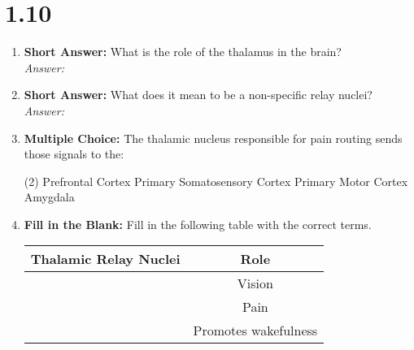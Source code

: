 \section*{1.10}
\begin{enumerate}[label=\textbf{Q1.10.\arabic*}]
      \item \textbf{Short Answer:} What is the role of the thalamus in the brain? \\
            \textit{Answer:} %

      \item \textbf{Short Answer:} What does it mean to be a non-specific relay nuclei? \\
            \textit{Answer:} %

      \item \textbf{Multiple Choice:} The thalamic nucleus responsible for pain routing sends those signals to the:
            \begin{tasks}[label=\textcolor{\documentTheme}{(\Alph*)}, item-format=\color{\documentTheme}, label-width=1.5em, item-indent=1.7em](2) %
                  \task Prefrontal Cortex
                  \task Primary Somatosensory Cortex
                  \task Primary Motor Cortex
                  \task Amygdala
            \end{tasks}

      \item \textbf{Fill in the Blank:} Fill in the following table with the correct terms.
      \begin{table}[htbp]
            \centering
            \begin{tabular}{cc}
                  \toprule
                  \textbf{Thalamic Relay Nuclei} & \textbf{Role} \\ \midrule
                  \underline{\hspace{3cm}}       & Vision               \\
                  \underline{\hspace{3cm}}       & Pain                 \\
                  \underline{\hspace{3cm}}       & Promotes wakefulness \\
                  \bottomrule
            \end{tabular}
      \end{table}


\end{enumerate}
